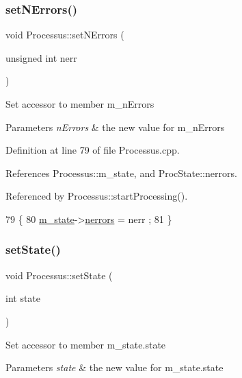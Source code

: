 \subsubsection{\texorpdfstring{set\+N\+Errors()}{setNErrors()}}
{\footnotesize\ttfamily void Processus\+::set\+N\+Errors (\begin{DoxyParamCaption}\item[{unsigned int}]{nerr }\end{DoxyParamCaption})\hspace{0.3cm}{\ttfamily [inherited]}}

Set accessor to member m\+\_\+n\+Errors 
\begin{DoxyParams}{Parameters}
{\em n\+Errors} & the new value for m\+\_\+n\+Errors \\
\hline
\end{DoxyParams}


Definition at line 79 of file Processus.\+cpp.



References Processus\+::m\+\_\+state, and Proc\+State\+::nerrors.



Referenced by Processus\+::start\+Processing().


\begin{DoxyCode}
79                                              \{
80   \hyperlink{classProcessus_ab3539eee42891ceae0baf4395ae7fb61}{m\_state}->\hyperlink{structProcState_a51a0f54ba62b07e07ac8518c5f32828d}{nerrors} = nerr ;
81 \}
\end{DoxyCode}
\mbox{\label{classProcessus_ad38cde0f1bcefa00b068e7947b8af927}} 
\subsubsection{\texorpdfstring{set\+State()}{setState()}}
{\footnotesize\ttfamily void Processus\+::set\+State (\begin{DoxyParamCaption}\item[{int}]{state }\end{DoxyParamCaption})\hspace{0.3cm}{\ttfamily [inherited]}}

Set accessor to member m\+\_\+state.\+state 
\begin{DoxyParams}{Parameters}
{\em state} & the new value for m\+\_\+state.\+state \\
\hline
\end{DoxyParams}


